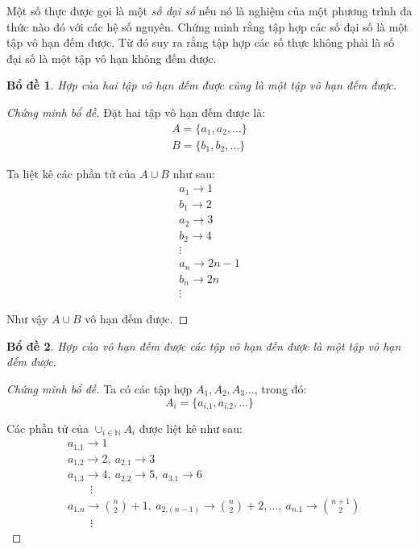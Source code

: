 \documentclass[class=linearalgebra,crop=false]{standalone}
\newtheorem{lemma}{Bổ đề}
\begin{document}
\begin{exercise}Một số thực được gọi là một \textit{số đại số} nếu nó là nghiệm của một phương trình đa thức nào đó với các hệ số nguyên. Chứng minh rằng tập hợp các số đại số là một tập vô hạn đếm được. Từ đó suy ra rằng tập hợp các số thực không phải là số đại số là một tập vô hạn không đếm được.
\end{exercise}

\begin{lemma}Hợp của hai tập vô hạn đếm được cũng là một tập vô hạn đếm được.
\end{lemma}

\begin{proof}[Chứng minh bổ đề] Đặt hai tập vô hạn đếm được là:
    \begin{gather*}
        A = \{ a_{1}, a_{2}, \ldots \} \\
        B = \{ b_{1}, b_{2}, \ldots \}
    \end{gather*}

    \par Ta liệt kê các phần tử của $A\cup B$ như sau:
    \begin{gather*}
        a_{1} \rightarrow 1 \\
        b_{1} \rightarrow 2 \\
        a_{2} \rightarrow 3 \\
        b_{2} \rightarrow 4 \\
        \vdots \\
        a_{n} \rightarrow 2n - 1 \\
        b_{n} \rightarrow 2n \\
        \vdots
    \end{gather*}
    \par Như vậy $A\cup B$ vô hạn đếm được.
\end{proof}

\begin{lemma}Hợp của vô hạn đếm được các tập vô hạn đến được là một tập vô hạn đếm được.
\end{lemma}

\begin{proof}[Chứng minh bổ đề]Ta có các tập hợp $A_{1}, A_{2}, A_{3} \ldots$, trong đó:
    \[ A_{i} = \{ a_{i.1}, a_{i.2}, \ldots \} \]
    \par Các phần tử của $\cup_{i\in \mathbb{N}}A_{i}$ được liệt kê như sau:
    \begin{align*}
        & a_{1.1} \rightarrow 1 \\
        & a_{1.2} \rightarrow 2,\ a_{2.1} \rightarrow 3 \\
        & a_{1.3} \rightarrow 4,\ a_{2.2} \rightarrow 5,\ a_{3.1} \rightarrow 6 \\
        & \qquad\vdots \\
        & a_{1.n} \rightarrow \binom{n}{2} + 1,\ a_{2.(n-1)} \rightarrow \binom{n}{2} + 2, \ldots,\ a_{n.1} \rightarrow \binom{n + 1}{2} \\
        & \qquad\vdots
    \end{align*}
\end{proof}
\end{document}
